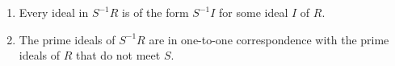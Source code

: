 \begin{enumerate}[label=(\roman*)]
	\item Every ideal in $S^{-1}R$ is of the form $S^{-1}I$ for some
		ideal $I$ of  $R$.
	\item The prime ideals of $S^{-1}R$ are in one-to-one correspondence with
		the prime ideals of $R$ that do not meet $S$.
\end{enumerate}
